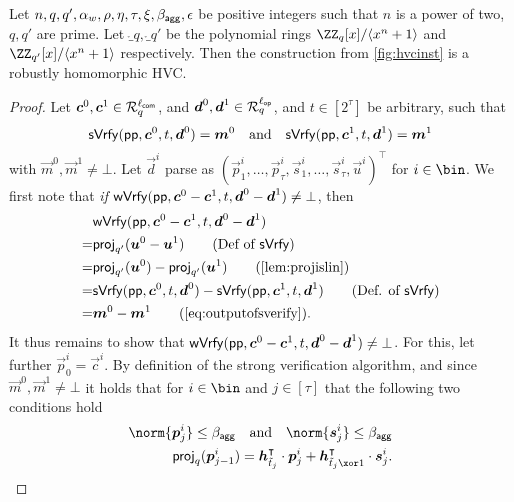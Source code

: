 \begin{lemma}\label{lem:hvcrobhom}
  Let $n,q,q',\alpha_w,\rho,\eta,\tau,\xi,\beta_{\mathsf{agg}},\epsilon$ be positive integers such that $n$ is a power of two, $q,q'$ are prime.
  Let $\ring_q,\ring_{q'}$ be the polynomial rings $\ZZ_q[x]/\langle x^n+1\rangle$ and $\ZZ_{q'}[x]/\langle x^n+1\rangle$ respectively.
  Then the construction from \autoref{fig:hvcinst} is a robustly homomorphic HVC.
\end{lemma}
\begin{proof}
Let $\boldsymbol{c}^0,\boldsymbol{c}^1 \in \mathcal{R}_q^{\ell_{\mathsf{com}}}$, and $\boldsymbol{d}^0, \boldsymbol{d}^1 \in \mathcal{R}_q^{\ell_{\mathsf{op}}}$, and $t\in[2^\tau]$ be arbitrary, such that
\begin{equation}
    \mathsf{sVrfy}(\mathsf{pp},\boldsymbol{c}^0, t,\boldsymbol{d}^0)=\boldsymbol{m}^0 \quad \text{and} \quad \mathsf{sVrfy}(\mathsf{pp},\boldsymbol{c}^1, t,\boldsymbol{d}^1)=\boldsymbol{m}^1\label{eq:outputofsverify}
\end{equation}
with $\vec{m}^0,\vec{m}^1\neq \bot$.
Let $\vec{d}^i$ parse as $(\vec{p}^i_1,\dots,\vec{p}^i_{\tau},\vec{s}^i_1, \dots, \vec{s}^i_{\tau},\vec{u}^i)^\intercal$ for $i\in\bin$.
We first note that \emph{if} $\mathsf{wVrfy}(\mathsf{pp},\boldsymbol{c}^0-\boldsymbol{c}^1, t,\boldsymbol{d}^0-\boldsymbol{d}^1)\neq\bot$, then
\begin{align*}
  &\wverify(\params,\vec{c}^0-\vec{c}^1, t,\vec{d}^0-\vec{d}^1)\\
  =&\proj_{q'}(\vec{u}^0-\vec{u}^1)\tag{Def of $\sverify$}\\
  =&\proj_{q'}(\vec{u}^0)-\proj_{q'}(\vec{u}^1)\tag{\autoref{lem:projislin}}\\
  =&\sverify(\params,\vec{c}^0, t,\vec{d}^0)-\sverify(\params,\vec{c}^1, t,\vec{d}^1)\tag{Def. of $\sverify$}\\
  =&\vec{m}^0- \vec{m}^1 \tag{\autoref{eq:outputofsverify}}.
\end{align*}
%
It thus remains to show that $\mathsf{wVrfy}(\mathsf{pp},\boldsymbol{c}^0-\boldsymbol{c}^1, t,\boldsymbol{d}^0-\boldsymbol{d}^1)\neq\bot$.
For this, let further $\vec{p}^i_0 = \vec{c}^i$.
By definition of the strong verification algorithm, and since $\vec{m}^0,\vec{m}^1\neq\bot$ it holds that for $i\in\bin$ 
and $j \in [\tau]$ that the following two conditions hold
\begin{align}
  \norm{\vec{p}^i_{j}} \leq \bagg\quad\text{and}\quad
  \norm{\vec{s}^i_{j}} \leq \bagg\label{eq:robhomnormcheck}\\
  \proj_q(\vec{p}^i_{j-1}) = \vec{h}_{\tilde t_j}^\intercal\cdot \vec{p}^i_{j} + \vec{h}_{\tilde t_j\xor 1}^\intercal \cdot \vec{s}^i_{j}.\label{eq:robhompathcheck}
  \end{align}

\end{proof}
